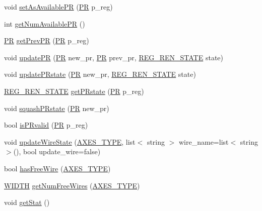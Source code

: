 \begin{DoxyCompactItemize}
\item 
void \hyperlink{classo3__registerRename_aae9d93d826236d42ba090d1d53ba62af}{setAsAvailablePR} (\hyperlink{global_2global_8h_a54dcae2ba04c76c12afe113b706bd4dc}{PR} p\_\-reg)
\item 
int \hyperlink{classo3__registerRename_af3dacac6db9095e6aa73da550e2c71bc}{getNumAvailablePR} ()
\item 
\hyperlink{global_2global_8h_a54dcae2ba04c76c12afe113b706bd4dc}{PR} \hyperlink{classo3__registerRename_ab76f162d8e2a6228404670bda2bad322}{getPrevPR} (\hyperlink{global_2global_8h_a54dcae2ba04c76c12afe113b706bd4dc}{PR} p\_\-reg)
\item 
void \hyperlink{classo3__registerRename_a6e6d2444676ba95b85d0a84908f6e5fe}{updatePR} (\hyperlink{global_2global_8h_a54dcae2ba04c76c12afe113b706bd4dc}{PR} new\_\-pr, \hyperlink{global_2global_8h_a54dcae2ba04c76c12afe113b706bd4dc}{PR} prev\_\-pr, \hyperlink{global_2global_8h_aa58e77d5a6caaeed4d4bd6f5b30f3ee7}{REG\_\-REN\_\-STATE} state)
\item 
void \hyperlink{classo3__registerRename_a6e6c35b5b477597e3eafed6def8c574b}{updatePRstate} (\hyperlink{global_2global_8h_a54dcae2ba04c76c12afe113b706bd4dc}{PR} new\_\-pr, \hyperlink{global_2global_8h_aa58e77d5a6caaeed4d4bd6f5b30f3ee7}{REG\_\-REN\_\-STATE} state)
\item 
\hyperlink{global_2global_8h_aa58e77d5a6caaeed4d4bd6f5b30f3ee7}{REG\_\-REN\_\-STATE} \hyperlink{classo3__registerRename_a62accbd82ef62f8c411975e824d644af}{getPRstate} (\hyperlink{global_2global_8h_a54dcae2ba04c76c12afe113b706bd4dc}{PR} p\_\-reg)
\item 
void \hyperlink{classo3__registerRename_aebbf6e056ef5e4c50081db9dc1817a2b}{squashPRstate} (\hyperlink{global_2global_8h_a54dcae2ba04c76c12afe113b706bd4dc}{PR} new\_\-pr)
\item 
bool \hyperlink{classo3__registerRename_a66e4f1bfb4aef291e88933aad6c46ce6}{isPRvalid} (\hyperlink{global_2global_8h_a54dcae2ba04c76c12afe113b706bd4dc}{PR} p\_\-reg)
\item 
void \hyperlink{classo3__registerRename_a6baada285270ffebab40fd8ad7afdac7}{updateWireState} (\hyperlink{binaryTranslator_2global_8h_a94b8423a23b95a7adac22848b81e7c0c}{AXES\_\-TYPE}, list$<$ string $>$ wire\_\-name=list$<$ string $>$(), bool update\_\-wire=false)
\item 
bool \hyperlink{classo3__registerRename_ad542e96684b7c2179bbf5fc6a87ab50c}{hasFreeWire} (\hyperlink{binaryTranslator_2global_8h_a94b8423a23b95a7adac22848b81e7c0c}{AXES\_\-TYPE})
\item 
\hyperlink{global_2global_8h_a6fa2e24b8a418fa215e183264cbea3aa}{WIDTH} \hyperlink{classo3__registerRename_a0161dbd03732a138dbc3ed48f385392c}{getNumFreeWires} (\hyperlink{binaryTranslator_2global_8h_a94b8423a23b95a7adac22848b81e7c0c}{AXES\_\-TYPE})
\item 
void \hyperlink{classo3__registerRename_ae797fc0baafbdbfb57d5b4d3b1095c17}{getStat} ()
\end{DoxyCompactItemize}


